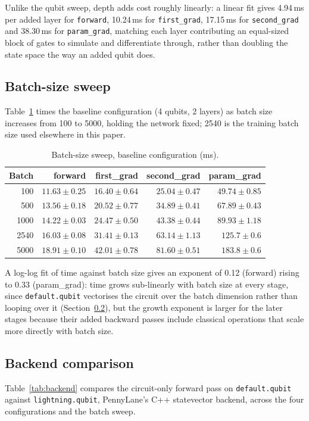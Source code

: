 Unlike the qubit sweep, depth adds cost roughly linearly: a linear fit gives 4.94\,ms per added layer for
\texttt{forward}, 10.24\,ms for \texttt{first\_grad}, 17.15\,ms for \texttt{second\_grad} and 38.30\,ms for
\texttt{param\_grad}, matching each layer contributing an equal-sized block of gates to simulate and
differentiate through, rather than doubling the state space the way an added qubit does.

\subsection{Batch-size sweep}
\label{sec:res-batch}
Table~\ref{tab:batch-sweep} times the baseline configuration (4 qubits, 2 layers) as batch size increases
from 100 to 5000, holding the network fixed; 2540 is the training batch size used elsewhere in this paper.

\begin{table}[h]
\centering
\caption{Batch-size sweep, baseline configuration (ms).}
\label{tab:batch-sweep}
\small
\begin{tabular}{@{}rrrrr@{}}
\toprule
Batch & forward & first\_grad & second\_grad & param\_grad \\
\midrule
100  & $11.63\pm0.25$ & $16.40\pm0.64$ & $25.04\pm0.47$ & $49.74\pm0.85$ \\
500  & $13.56\pm0.18$ & $20.52\pm0.77$ & $34.89\pm0.41$ & $67.89\pm0.43$ \\
1000 & $14.22\pm0.03$ & $24.47\pm0.50$ & $43.38\pm0.44$ & $89.93\pm1.18$ \\
2540 & $16.03\pm0.08$ & $31.41\pm0.13$ & $63.14\pm1.13$ & $125.7\pm0.6$ \\
5000 & $18.91\pm0.10$ & $42.01\pm0.78$ & $81.60\pm0.51$ & $183.8\pm0.6$ \\
\bottomrule
\end{tabular}
\end{table}

A log-log fit of time against batch size gives an exponent of 0.12 (forward) rising to 0.33 (param\_grad):
time grows sub-linearly with batch size at every stage, since \texttt{default.qubit} vectorises the circuit
over the batch dimension rather than looping over it (Section~\ref{sec:res-backend}), but the growth
exponent is larger for the later stages because their added backward passes include classical operations
that scale more directly with batch size.

\subsection{Backend comparison}
\label{sec:res-backend}
Table~\ref{tab:backend} compares the circuit-only forward pass on \texttt{default.qubit} against
\texttt{lightning.qubit}, PennyLane's C++ statevector backend, across the four configurations and the batch
sweep.

